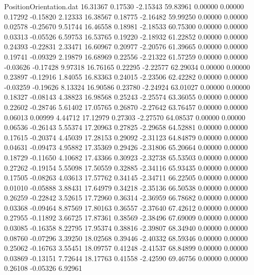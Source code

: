 \begin{filecontents}{PositionOrientation.dat}
  16.31367    0.17530   -2.15343    59.83961    0.00000    0.00000    0.17292   -0.15820    2.12333
  16.38567    0.18775   -2.16482    59.99250    0.00000    0.00000    0.02578   -0.25670    9.51744
  16.46558    0.18981   -2.18533    60.75300    0.00000    0.00000    0.03313   -0.05526    6.59753
  16.53765    0.19220   -2.18932    61.22852    0.00000    0.00000    0.24393   -0.22831    2.33471
  16.60967    0.20977   -2.20576    61.39665    0.00000    0.00000    0.19741   -0.09329    2.19879
  16.68969    0.22556   -2.21322    61.57259    0.00000    0.00000   -0.03626   -0.17428    9.97318
  16.76165    0.22295   -2.22577    62.29034    0.00000    0.00000    0.23897   -0.12916    1.84055
  16.83363    0.24015   -2.23506    62.42282    0.00000    0.00000   -0.03259   -0.19626    8.13324
  16.90586    0.23780   -2.24924    63.01027    0.00000    0.00000    0.18327   -0.08143    4.38823
  16.98568    0.25243   -2.25574    63.36055    0.00000    0.00000    0.22602   -0.28746    5.61402
  17.05765    0.26870   -2.27642    63.76457    0.00000    0.00000    0.06013    0.00999    4.44712
  17.12979    0.27303   -2.27570    64.08537    0.00000    0.00000    0.06536   -0.26143    5.55374
  17.20963    0.27825   -2.29658    64.52881    0.00000    0.00000    0.17615   -0.20374    4.45039
  17.28153    0.29092   -2.31123    64.84879    0.00000    0.00000    0.04631   -0.09473    4.95882
  17.35369    0.29426   -2.31806    65.20664    0.00000    0.00000    0.18729   -0.11650    4.10682
  17.43366    0.30923   -2.32738    65.53503    0.00000    0.00000    0.27262   -0.19154    5.55098
  17.50559    0.32885   -2.34116    65.93435    0.00000    0.00000    0.17505   -0.08263    4.03613
  17.57762    0.34145   -2.34711    66.22505    0.00000    0.00000    0.01010   -0.05888    3.88431
  17.64979    0.34218   -2.35136    66.50538    0.00000    0.00000    0.26259   -0.22842    3.52615
  17.72960    0.36314   -2.36959    66.78682    0.00000    0.00000    0.03368   -0.09464    8.87569
  17.80163    0.36557   -2.37640    67.42612    0.00000    0.00000    0.27955   -0.11892    3.66725
  17.87361    0.38569   -2.38496    67.69009    0.00000    0.00000    0.03085   -0.16358    8.22795
  17.95374    0.38816   -2.39807    68.34940    0.00000    0.00000    0.08760   -0.07296    3.39250
  18.02568    0.39446   -2.40332    68.59346    0.00000    0.00000    0.25062   -0.16763    3.55451
  18.09757    0.41248   -2.41537    68.84899    0.00000    0.00000    0.03869   -0.13151    7.72644
  18.17763    0.41558   -2.42590    69.46756    0.00000    0.00000    0.26108   -0.05326    6.92961

\end{filecontents}
